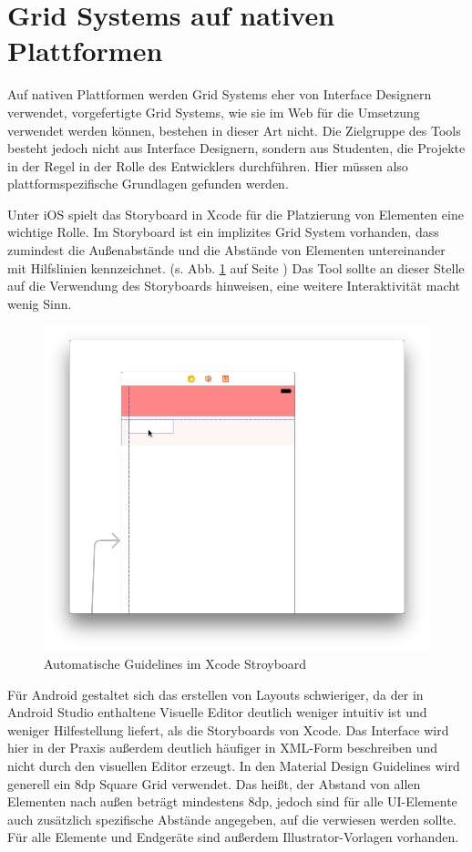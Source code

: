 \section{Grid Systems auf nativen Plattformen}
Auf nativen Plattformen werden Grid Systems eher von Interface Designern verwendet, vorgefertigte Grid Systems, wie sie im Web für die Umsetzung verwendet werden können, bestehen in dieser Art nicht. Die Zielgruppe des Tools besteht jedoch nicht aus Interface Designern, sondern aus Studenten, die Projekte in der Regel in der Rolle des Entwicklers durchführen. Hier müssen also plattformspezifische Grundlagen gefunden werden.

Unter iOS spielt das Storyboard in Xcode für die Platzierung von Elementen eine wichtige Rolle. Im Storyboard ist ein implizites Grid System vorhanden, dass zumindest die Außenabstände und die Abstände von Elementen untereinander mit Hilfslinien kennzeichnet. (s. Abb. \ref{fig:xcode-guides} auf Seite \pageref{fig:xcode-guides})
Das Tool sollte an dieser Stelle auf die Verwendung des Storyboards hinweisen, eine weitere Interaktivität macht wenig Sinn.

\begin{figure}[h]
    \centering
    \includegraphics[width=1\textwidth]{images/xcode-guidelines.png}
    \caption{Automatische Guidelines im Xcode Stroyboard}
    \label{fig:xcode-guides}
\end{figure}

Für Android gestaltet sich das erstellen von Layouts schwieriger, da der in Android Studio enthaltene Visuelle Editor deutlich weniger intuitiv ist und weniger Hilfestellung liefert, als die Storyboards von Xcode. Das Interface wird hier in der Praxis außerdem deutlich häufiger in XML-Form beschreiben und nicht durch den visuellen Editor erzeugt. In den Material Design Guidelines wird generell ein 8dp Square Grid verwendet. Das heißt, der Abstand von allen Elementen nach außen beträgt mindestens 8dp, jedoch sind für alle UI-Elemente auch zusätzlich spezifische Abstände angegeben, auf die verwiesen werden sollte. Für alle Elemente und Endgeräte sind außerdem Illustrator-Vorlagen vorhanden. 

